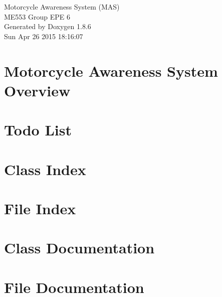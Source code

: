 \documentclass[twoside]{article}
\begin{document}
\hypersetup{pageanchor=false}
\begin{titlepage}
\vspace*{7cm}
\begin{center}%
{\Large Motorcycle Awareness System (M\-A\-S) \\[1ex]\large M\-E553 Group E\-P\-E 6 }\\
\vspace*{1cm}
{\large Generated by Doxygen 1.8.6}\\
\vspace*{0.5cm}
{\small Sun Apr 26 2015 18:16:07}\\
\end{center}
\end{titlepage}
\tableofcontents
{}
\hypersetup{pageanchor=true}

\section{Motorcycle Awareness System Overview}
\label{index}\hypertarget{index}{}
\section{Todo List}
\label{todo}
\hypertarget{todo}{}

\section{Class Index}

\section{File Index}

\section{Class Documentation}






\section{File Documentation}










\newpage
{}
{}
\printindex
\end{document}
